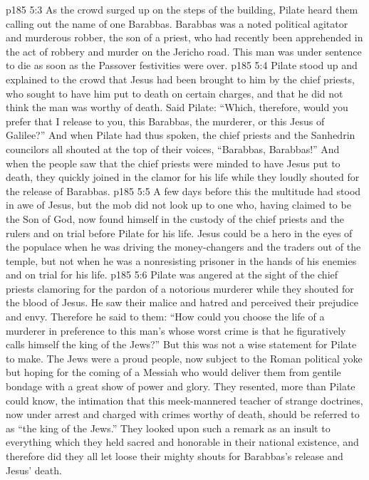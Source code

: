 \vs p185 5:3 As the crowd surged up on the steps of the building, Pilate heard them calling out the name of one Barabbas. Barabbas was a noted political agitator and murderous robber, the son of a priest, who had recently been apprehended in the act of robbery and murder on the Jericho road. This man was under sentence to die as soon as the Passover festivities were over.
\vs p185 5:4 Pilate stood up and explained to the crowd that Jesus had been brought to him by the chief priests, who sought to have him put to death on certain charges, and that he did not think the man was worthy of death. Said Pilate: “Which, therefore, would you prefer that I release to you, this Barabbas, the murderer, or this Jesus of Galilee?” And when Pilate had thus spoken, the chief priests and the Sanhedrin councilors all shouted at the top of their voices, “Barabbas, Barabbas!” And when the people saw that the chief priests were minded to have Jesus put to death, they quickly joined in the clamor for his life while they loudly shouted for the release of Barabbas.
\vs p185 5:5 A few days before this the multitude had stood in awe of Jesus, but the mob did not look up to one who, having claimed to be the Son of God, now found himself in the custody of the chief priests and the rulers and on trial before Pilate for his life. Jesus could be a hero in the eyes of the populace when he was driving the money\hyp{}changers and the traders out of the temple, but not when he was a nonresisting prisoner in the hands of his enemies and on trial for his life.
\vs p185 5:6 Pilate was angered at the sight of the chief priests clamoring for the pardon of a notorious murderer while they shouted for the blood of Jesus. He saw their malice and hatred and perceived their prejudice and envy. Therefore he said to them: “How could you choose the life of a murderer in preference to this man’s whose worst crime is that he figuratively calls himself the king of the Jews?” But this was not a wise statement for Pilate to make. The Jews were a proud people, now subject to the Roman political yoke but hoping for the coming of a Messiah who would deliver them from gentile bondage with a great show of power and glory. They resented, more than Pilate could know, the intimation that this meek\hyp{}mannered teacher of strange doctrines, now under arrest and charged with crimes worthy of death, should be referred to as “the king of the Jews.” They looked upon such a remark as an insult to everything which they held sacred and honorable in their national existence, and therefore did they all let loose their mighty shouts for Barabbas’s release and Jesus’ death.
